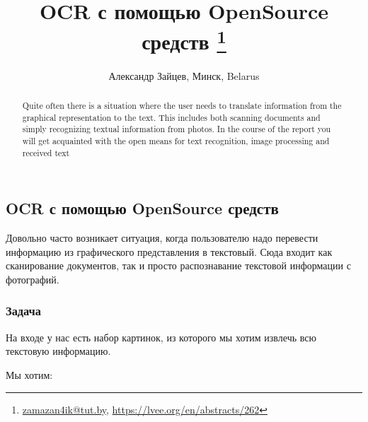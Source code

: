 \documentclass[10pt, a5paper]{article}
\begin{document}
\title{OCR с помощью OpenSource средств \footnote{\url{zamazan4ik@tut.by}, \url{https://lvee.org/en/abstracts/262}}}
\author{Александр Зайцев, Минск, Belarus}
\maketitle
\begin{abstract}
Quite often there is a situation where the user needs to translate information from the graphical representation to the text. This includes both scanning documents and simply recognizing textual information from photos. In the course of the report you will get acquainted with the open means for text recognition, image processing and received text
\end{abstract}
\subsection*{OCR с помощью OpenSource средств}

Довольно часто возникает ситуация, когда пользователю надо перевести информацию из графического представления в текстовый. Сюда входит как сканирование документов, так и просто распознавание текстовой информации с фотографий.

\subsubsection*{Задача}

На входе у нас есть набор картинок, из которого мы хотим извлечь всю текстовую информацию.

Мы хотим:
\end{document}
